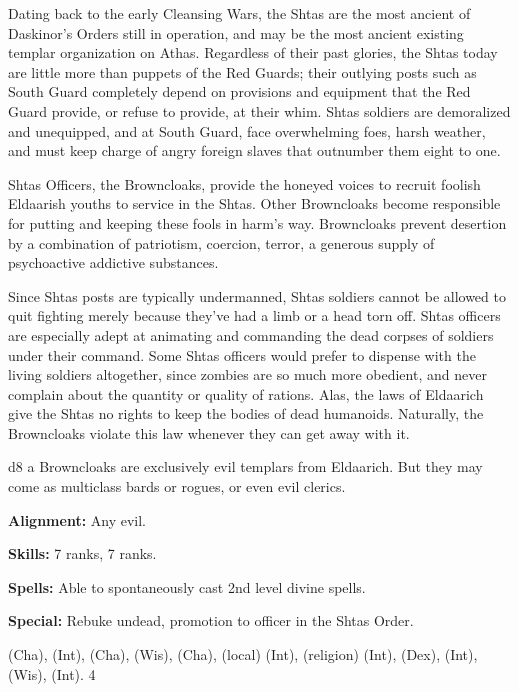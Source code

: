 {}{}
{Dating back to the early Cleansing Wars, the Shtas are the most ancient of Daskinor's Orders still in operation, and may be the most ancient existing templar organization on Athas. Regardless of their past glories, the Shtas today are little more than puppets of the Red Guards; their outlying posts such as South Guard completely depend on provisions and equipment that the Red Guard provide, or refuse to provide, at their whim. Shtas soldiers are demoralized and unequipped, and at South Guard, face overwhelming foes, harsh weather, and must keep charge of angry foreign slaves that outnumber them eight to one.

Shtas Officers, the Browncloaks, provide the honeyed voices to recruit foolish Eldaarish youths to service in the Shtas. Other Browncloaks become responsible for putting and keeping these fools in harm's way. Browncloaks prevent desertion by a combination of patriotism, coercion, terror, a generous supply of psychoactive addictive substances.

Since Shtas posts are typically undermanned, Shtas soldiers cannot be allowed to quit fighting merely because they've had a limb or a head torn off. Shtas officers are especially adept at animating and commanding the dead corpses of soldiers under their command. Some Shtas officers would prefer to dispense with the living soldiers altogether, since zombies are so much more obedient, and never complain about the quantity or quality of rations. Alas, the laws of Eldaarich give the Shtas no rights to keep the bodies of dead humanoids. Naturally, the Browncloaks violate this law whenever they can get away with it.}
{d8}
{a}
{Browncloaks are exclusively evil templars from Eldaarich. But they may come as multiclass bards or rogues, or even evil clerics.}
{
\textbf{Alignment:} Any evil.

\textbf{Skills:}  7 ranks,  7 ranks.

\textbf{Spells:} Able to spontaneously cast 2nd level divine spells.

\textbf{Special:} Rebuke undead, promotion to officer in the Shtas Order.
}
{ (Cha),  (Int),  (Cha),  (Wis),  (Cha),  (local) (Int),  (religion) (Int),  (Dex),  (Int),  (Wis),  (Int).}
{4}

